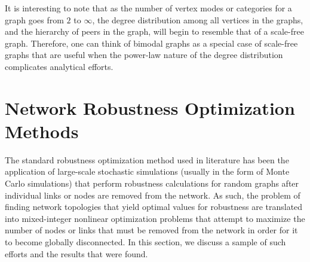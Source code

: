 \documentclass[doc]{apa}%
\begin{document}
It is interesting to note that as the number of vertex modes or categories for a graph goes from $2$ to $\infty$, the degree distribution among all vertices in the graphs, and the hierarchy of peers in the graph, will begin to resemble that of a scale-free graph. Therefore, one can think of bimodal graphs as a special case of scale-free graphs that are useful when the power-law nature of the degree distribution complicates analytical efforts.

\section{Network Robustness Optimization Methods}

The standard robustness optimization method used in literature has been the application of large-scale stochastic simulations (usually in the form of Monte Carlo simulations) that perform robustness calculations for random graphs after individual links or nodes are removed from the network. As such, the problem of finding network topologies that yield optimal values for robustness are translated into mixed-integer nonlinear optimization problems that attempt to maximize the number of nodes or links that must be removed from the network in order for it to become globally disconnected. In this section, we discuss a sample of such efforts and the results that were found.
\end{document}
